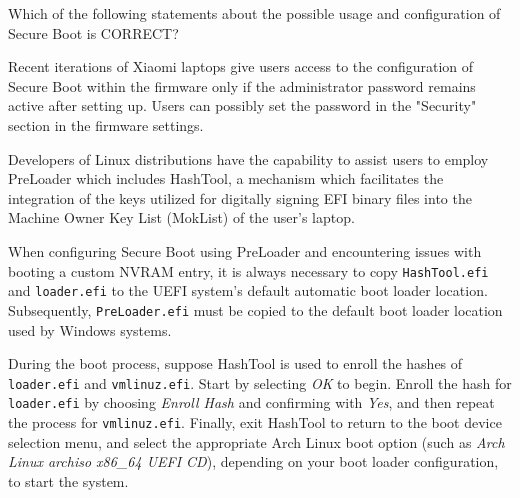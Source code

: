 \documentclass{exam-zh}
\begin{document}
\begin{question}
Which of the following statements about the possible usage and configuration of Secure Boot is CORRECT?

\begin{choices}
\item Recent iterations of Xiaomi laptops give users access to the configuration of Secure Boot within the firmware only if the administrator password remains active after setting up. Users can possibly set the password in the "Security" section in the firmware settings.

\item Developers of Linux distributions have the capability to assist users to employ PreLoader which includes HashTool, a mechanism which facilitates the integration of the keys utilized for digitally signing EFI binary files into the Machine Owner Key List (MokList) of the user's laptop.

\item When configuring Secure Boot using PreLoader and encountering issues with booting a custom NVRAM entry, it is always necessary to copy \texttt{HashTool.efi} and \texttt{loader.efi} to the UEFI system's default automatic boot loader location. Subsequently, \texttt{PreLoader.efi} must be copied to the default boot loader location used by Windows systems.

\item During the boot process, suppose HashTool is used to enroll the hashes of \texttt{loader.efi} and \texttt{vmlinuz.efi}. Start by selecting \textit{OK} to begin. Enroll the hash for \texttt{loader.efi} by choosing \textit{Enroll Hash} and confirming with \textit{Yes}, and then repeat the process for \texttt{vmlinuz.efi}. Finally, exit HashTool to return to the boot device selection menu, and select the appropriate Arch Linux boot option (such as \textit{Arch Linux archiso x86\_64 UEFI CD}), depending on your boot loader configuration, to start the system.
\end{choices}
\end{question}
\end{document}
